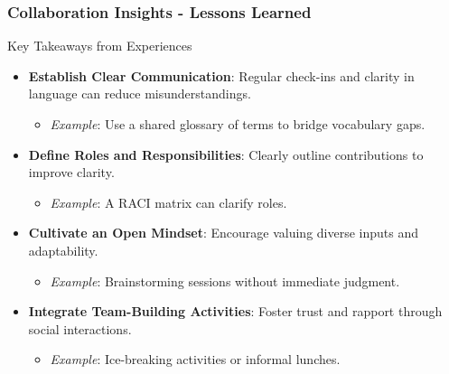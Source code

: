 \documentclass[aspectratio=169]{beamer}
\begin{document}
\begin{frame}[fragile]
    \frametitle{Collaboration Insights - Lessons Learned}
    \begin{block}{Key Takeaways from Experiences}
        \begin{itemize}
            \item \textbf{Establish Clear Communication}: Regular check-ins and clarity in language can reduce misunderstandings.
              \begin{itemize}
                  \item \textit{Example}: Use a shared glossary of terms to bridge vocabulary gaps.
              \end{itemize}
            \item \textbf{Define Roles and Responsibilities}: Clearly outline contributions to improve clarity.
              \begin{itemize}
                  \item \textit{Example}: A RACI matrix can clarify roles.
              \end{itemize}
            \item \textbf{Cultivate an Open Mindset}: Encourage valuing diverse inputs and adaptability.
              \begin{itemize}
                  \item \textit{Example}: Brainstorming sessions without immediate judgment.
              \end{itemize}
            \item \textbf{Integrate Team-Building Activities}: Foster trust and rapport through social interactions.
              \begin{itemize}
                  \item \textit{Example}: Ice-breaking activities or informal lunches.
              \end{itemize}
        \end{itemize}
    \end{block}
\end{frame}
\end{document}
